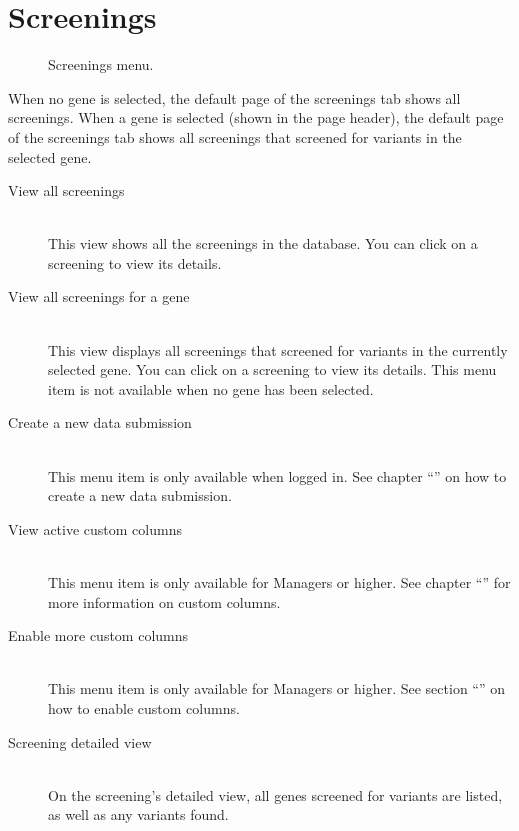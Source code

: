 \section{Screenings}
\begin{wrapfigure}[9]{l}{7cm}
  \vspace{-25pt}
  \begin{shaded}
    \centering
    \caption{Screenings menu.}
  \end{shaded}
\end{wrapfigure}
When no gene is selected, the default page of the screenings tab shows all screenings.
When a gene is selected (shown in the page header),
 the default page of the screenings tab shows all screenings that screened for variants in the selected gene.
\clearpage

\begin{description}
  \item [View all screenings] \hfill \\
  This view shows all the screenings in the database.
  You can click on a screening to view its details.
  \item [View all screenings for a gene] \hfill \\
  This view displays all screenings that screened for variants in the currently selected gene.
  You can click on a screening to view its details.
  This menu item is not available when no gene has been selected.
  \item [Create a new data submission] \hfill \\
  This menu item is only available when logged in.
  See chapter ``'' on how to create a new data submission.
  \item [View active custom columns] \hfill \\
  This menu item is only available for Managers or higher.
  See chapter ``'' for more information on custom columns.
  \item [Enable more custom columns] \hfill \\
  This menu item is only available for Managers or higher.
  See section ``'' on how to enable custom columns.
  \item [Screening detailed view] \hfill \\
  On the screening's detailed view, all genes screened for variants are listed, as well as any variants found.
\end{description}





